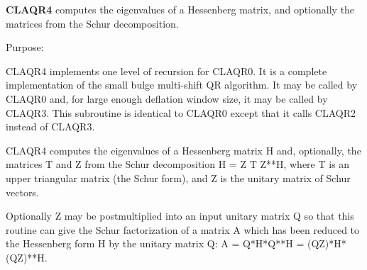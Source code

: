 {\bfseries C\+L\+A\+Q\+R4} computes the eigenvalues of a Hessenberg matrix, and optionally the matrices from the Schur decomposition. 

 \begin{DoxyParagraph}{Purpose\+: }
\begin{DoxyVerb}    CLAQR4 implements one level of recursion for CLAQR0.
    It is a complete implementation of the small bulge multi-shift
    QR algorithm.  It may be called by CLAQR0 and, for large enough
    deflation window size, it may be called by CLAQR3.  This
    subroutine is identical to CLAQR0 except that it calls CLAQR2
    instead of CLAQR3.

    CLAQR4 computes the eigenvalues of a Hessenberg matrix H
    and, optionally, the matrices T and Z from the Schur decomposition
    H = Z T Z**H, where T is an upper triangular matrix (the
    Schur form), and Z is the unitary matrix of Schur vectors.

    Optionally Z may be postmultiplied into an input unitary
    matrix Q so that this routine can give the Schur factorization
    of a matrix A which has been reduced to the Hessenberg form H
    by the unitary matrix Q:  A = Q*H*Q**H = (QZ)*H*(QZ)**H.\end{DoxyVerb}
 
\end{DoxyParagraph}

